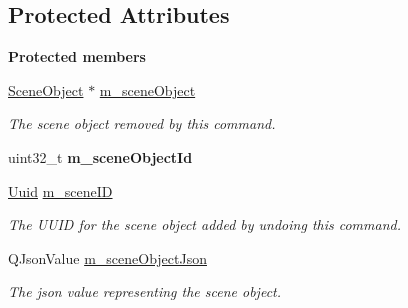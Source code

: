 \subsection*{Protected Attributes}
\begin{Indent}\textbf{ Protected members}\par
\begin{DoxyCompactItemize}
\item 
\mbox{\label{classrev_1_1_remove_scene_object_command_a38734313183c06f9e48e06109dd99329}} 
\mbox{\hyperlink{classrev_1_1_scene_object}{Scene\+Object}} $\ast$ \mbox{\hyperlink{classrev_1_1_remove_scene_object_command_a38734313183c06f9e48e06109dd99329}{m\+\_\+scene\+Object}}
\begin{DoxyCompactList}\small\item\em The scene object removed by this command. \end{DoxyCompactList}\item 
\mbox{\label{classrev_1_1_remove_scene_object_command_ae47cc5487d8792bfdd577f395188dbd4}} 
uint32\+\_\+t {\bfseries m\+\_\+scene\+Object\+Id}
\item 
\mbox{\label{classrev_1_1_remove_scene_object_command_a846e6fd510014a48054b496118566bef}} 
\mbox{\hyperlink{classrev_1_1_uuid}{Uuid}} \mbox{\hyperlink{classrev_1_1_remove_scene_object_command_a846e6fd510014a48054b496118566bef}{m\+\_\+scene\+ID}}
\begin{DoxyCompactList}\small\item\em The U\+U\+ID for the scene object added by undoing this command. \end{DoxyCompactList}\item 
\mbox{\label{classrev_1_1_remove_scene_object_command_a26ec675590ee84872edfd4efd5d78e55}} 
Q\+Json\+Value \mbox{\hyperlink{classrev_1_1_remove_scene_object_command_a26ec675590ee84872edfd4efd5d78e55}{m\+\_\+scene\+Object\+Json}}
\begin{DoxyCompactList}\small\item\em The json value representing the scene object. \end{DoxyCompactList}\end{DoxyCompactItemize}
\end{Indent}
